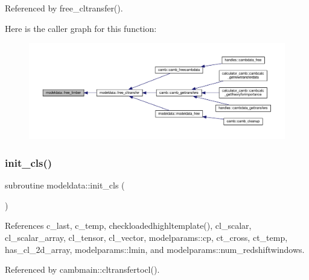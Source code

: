 Referenced by free\+\_\+cltransfer().

Here is the caller graph for this function\+:
\nopagebreak
\begin{figure}[H]
\begin{center}
\leavevmode
\includegraphics[width=350pt]{namespacemodeldata_a89ab0d30547c35685982ecf01d7145bd_icgraph}
\end{center}
\end{figure}
\mbox{\label{namespacemodeldata_a3b4fcde7e9343acbea6dd3d7b52aba10}} 
\subsubsection{\texorpdfstring{init\+\_\+cls()}{init\_cls()}}
{\footnotesize\ttfamily subroutine modeldata\+::init\+\_\+cls (\begin{DoxyParamCaption}{ }\end{DoxyParamCaption})}



References c\+\_\+last, c\+\_\+temp, checkloadedhighltemplate(), cl\+\_\+scalar, cl\+\_\+scalar\+\_\+array, cl\+\_\+tensor, cl\+\_\+vector, modelparams\+::cp, ct\+\_\+cross, ct\+\_\+temp, has\+\_\+cl\+\_\+2d\+\_\+array, modelparams\+::lmin, and modelparams\+::num\+\_\+redshiftwindows.



Referenced by cambmain\+::cltransfertocl().

